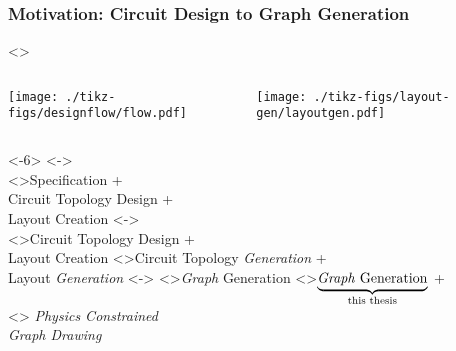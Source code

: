 \documentclass[./presentation.tex]{subfiles}
\begin{document}
\begin{frame}[label=flows1,t]
  \frametitle{Motivation: Circuit Design to Graph Generation}
  \centering
  \resetmfrc{}
\only<\mfrc{}>{
\begin{columns}
  \begin{column}{0.5\textwidth}
    \texttt{[image: ./tikz-figs/designflow/flow.pdf]}
  \end{column}
  \begin{column}{0.5\textwidth}
    \texttt{[image: ./tikz-figs/layout-gen/layoutgen.pdf]}
  \end{column}
\end{columns}
}
\stepmfrc{}
\only<\mfrc{}-6>{
\only<\mfrc{}->{
  {\large 
    \\
    \only<\mfrc{}>{Specification +\\ Circuit Topology Design +\\ Layout Creation}%
      \stepmfrc{}
      \only<\mfrc{}->{\\}
      \only<\mfrc{}>{Circuit Topology Design +\\ Layout Creation}%
      \stepmfrc{}
      \only<\mfrc{}>{Circuit Topology \emph{Generation} +\\ Layout \emph{Generation}}%
      \stepmfrc{}
  \only<\mfrc{}->{
  \only<\mfrc{}>{\emph{Graph} Generation}
  \only<>{$\underbrace{\text{\emph{Graph} Generation}}_{\text{this thesis}}$} +\\ \uncover<\mfrc{}>{
    \emph{Physics Constrained\visible<0>{ha}\\Graph Drawing} 
}
}
  }%
}%
}
\end{frame}
\end{document}
